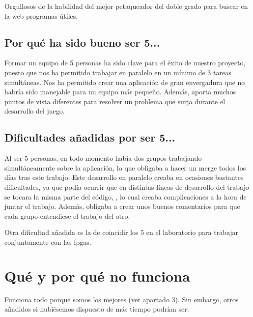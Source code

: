 \documentclass[11pt, a4paper, spanish, openright, twoside]{book}
\begin{document}
Orgullosos de la habilidad del mejor petaqueador del doble grado para buscar en la web programas útiles. 

\subsection{Por qué ha sido bueno ser 5...}
Formar un equipo de 5 personas ha sido clave para el éxito de nuestro proyecto, puesto que nos ha permitido trabajar en paralelo en un mínimo de 3 tareas simultáneas. Nos ha 
permitido crear una aplicación de gran envergadura que no habría sido manejable para un equipo más pequeño.
Además, aporta muchos puntos de vista diferentes para resolver un problema que surja durante el desarrollo del juego.


\subsection{Dificultades añadidas por ser 5...}

Al ser 5 personas, en todo momento había dos grupos trabajando simultáneamente sobre la aplicación, lo que obligaba a hacer un merge todos los días tras este trabajo. Este desarrollo en paralelo
creaba en ocasiones bastantes dificultades, ya que podía ocurrir que en distintas líneas de desarrollo del trabajo se tocara la misma parte del código, 
, lo cual creaba complicaciones a la hora de juntar el trabajo. Además, 
obligaba a crear unos buenos comentarios para que cada grupo entendiese el trabajo del otro. 

Otra dificultad añadida es la de coincidir los 5  en el laboratorio para trabajar conjuntamente con las fpgas.

\section{Qué y por qué no funciona}
Funciona todo porque somos los mejores (ver apartado 3). Sin embargo, otros añadidos si hubiésemos dispuesto de más tiempo podrían ser:
	
\end{document}
